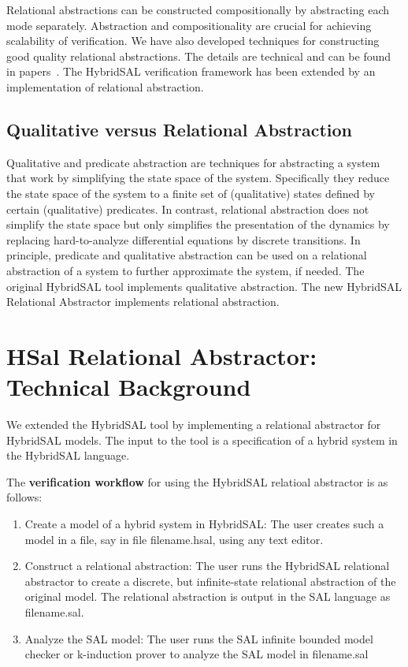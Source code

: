 \documentclass{article}
\begin{document}
Relational abstractions can be constructed compositionally by 
abstracting each mode separately.  Abstraction and compositionality
are crucial for achieving scalability of verification.
We have also developed techniques for constructing good quality 
relational abstractions.  The details are technical and can be 
found in papers~\cite{ST11:CAV,Tiwari03:HSCC}.  The HybridSAL verification framework has 
been extended by an implementation of relational abstraction.


\subsection{Qualitative versus Relational Abstraction}

Qualitative and predicate abstraction are techniques for abstracting
a system that work by simplifying the state space of the system.
Specifically they reduce the state space of the system to a finite
set of (qualitative) states defined by certain (qualitative) predicates.
In contrast, relational abstraction does not simplify the state space
but only simplifies the presentation of the dynamics by replacing
hard-to-analyze differential equations by discrete transitions.
In principle, predicate and qualitative abstraction can be used on
a relational abstraction of a system to further approximate the
system, if needed.  The original HybridSAL tool implements qualitative
abstraction.  The new HybridSAL Relational Abstractor implements
relational abstraction. 


\section{HSal Relational Abstractor: Technical Background}

We extended the HybridSAL tool by implementing a 
relational abstractor for HybridSAL models.
The input to the tool is a specification of a hybrid system 
in the HybridSAL language.  

The {\bf{verification workflow}} for using the HybridSAL relatioal
abstractor is as follows:
\begin{enumerate}
\item  Create a model of a hybrid system in HybridSAL:
 The user creates such a model in a file, say in 
 file filename.hsal, using any text editor.
\item
 Construct a relational abstraction:
 The user runs the HybridSAL relational abstractor to create a discrete,
 but infinite-state relational abstraction of the original model.
 The relational abstraction is output in the SAL language as
 filename.sal.
\item
 Analyze the SAL model:
 The user runs the SAL infinite bounded model checker or k-induction prover
 to analyze the SAL model in filename.sal
\end{enumerate}
\end{document}
